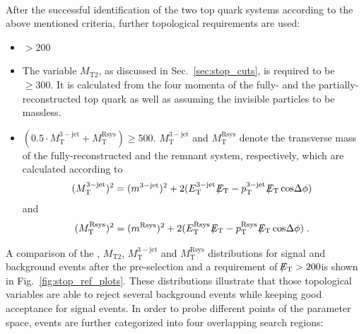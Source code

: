\\
After the successful identification of the two top quark systems according to the above mentioned criteria, further topological requirements are used:
\begin{itemize}
 \item \met $> 200$\gev
 \item The variable $M_\mathrm{T2}$, as discussed in Sec.~\ref{sec:stop_cuts}, is required to be $\ge 300$\gev. It is calculated from the four momenta of the fully- and the partially-reconstructed top quark as well as \met assuming the invisible particles to be massless. 
 \item $(0.5 \cdot M_\mathrm{T}^\mathrm{3-jet} + M_\mathrm{T}^\mathrm{Rsys}) \ge 500$\gev. $ M_\mathrm{T}^\mathrm{3-jet}$ and $M_\mathrm{T}^\mathrm{Rsys}$ denote the transverse mass of the fully-reconstructed and the remnant system, respectively, which are calculated according to
\begin{equation*}
( M_\mathrm{T}^\mathrm{3-jet})^2 = (m^{3-\mathrm{jet}})^2 + 2(E_\mathrm{T}^\mathrm{3-jet} \, \slash\mkern-12mu{E}_{\text{T}} - p_\mathrm{T}^\mathrm{3-jet} \, \slash\mkern-12mu{E}_{\text{T}} \, \mathrm{cos} \Delta \phi)
\end{equation*} 
and 
\begin{equation*}
( M_\mathrm{T}^\mathrm{Rsys})^2 = (m^\mathrm{Rsys})^2 + 2(E_\mathrm{T}^\mathrm{Rsys} \, \slash\mkern-12mu{E}_{\text{T}} - p_\mathrm{T}^\mathrm{Rsys} \, \slash\mkern-12mu{E}_{\text{T}} \, \mathrm{cos} \Delta \phi) \; .
\end{equation*} 
\end{itemize}
A comparison of the \met, $M_\mathrm{T2}$, $M_\mathrm{T}^\mathrm{3-jet}$ and $M_\mathrm{T}^\mathrm{Rsys}$ distributions for signal and background events after the pre-selection and a  requirement of $\slash\mkern-12mu{E}_{\text{T}} > 200$\gev is shown in Fig.~\ref{fig:stop_ref_plots}. These distributions illustrate that those topological variables are able to reject several background events while keeping good acceptance for signal events. %
In order to probe different points of the parameter space, events are further categorized into four overlapping search regions:

